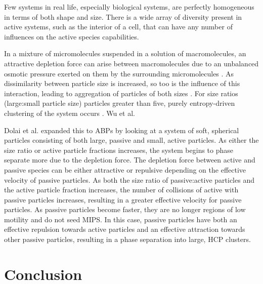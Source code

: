 \documentclass[11pt]{article}
\begin{document}
Few systems in real life, especially biological systems, are perfectly homogeneous in terms of both shape and size.  There is a wide array of diversity present in active systems, such as the interior of a cell, that can have any number of influences on the active species capabilities.  

In a mixture of micromolecules suspended in a solution of macromolecules, an attractive depletion force can arise between macromolecules due to an unbalanced osmotic pressure exerted on them by the surrounding micromolecules \cite{Asakura}.  As dissimilarity between particle size is increased, so too is the influence of this interaction, leading to aggregation of particles of both sizes \cite{Asakura2}.  For size ratios (large:small particle size) particles greater than five, purely entropy-driven clustering of the system occurs \cite{Biben, Frenkel}.  Wu et al. 

Dolai et al. \cite{Dolai} expanded this to ABPs by looking at a system of soft, spherical particles consisting of both large, passive and small, active particles.  As either the size ratio or active particle fractions increases, the system begins to phase separate more due to the depletion force. The depletion force between active and passive species can be either attractive or repulsive depending on the effective velocity of passive particles.  As both the size ratio of passive:active particles and the active particle fraction increases, the number of collisions of active with passive particles increases, resulting in a greater effective velocity for passive particles.  As passive particles become faster, they are no longer regions of low motility and do not seed MIPS.  In this case, passive particles have both an effective repulsion towards active particles and an effective attraction towards other passive particles, resulting in a phase separation into large, HCP clusters. 

\section{Conclusion}
\end{document}
